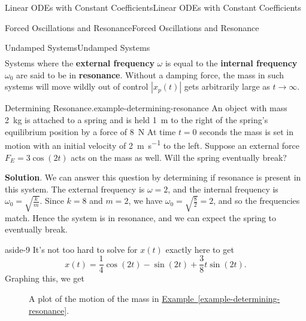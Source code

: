 \documentclass[10pt,]{book}
\newcommand{\terminology}[1]{\textbf{#1}}
\numberwithin{equation}{section}
\begin{document}
\begin{chapterptx}{Linear ODEs with Constant Coefficients}{}{Linear ODEs with Constant Coefficients}{}{}
\begin{sectionptx}{Forced Oscillations and Resonance}{}{Forced Oscillations and Resonance}{}{}
\begin{subsectionptx}{Undamped Systems}{}{Undamped Systems}{}{}
\begin{align*}
\end{align*}
Systems where the \terminology{external frequency} \(\omega\) is equal to the \terminology{internal frequency} \(\omega_{0}\) are said to be in \terminology{resonance}. Without a damping force, the mass in such systems will move wildly out of control \(|x_{p}(t)|\) gets arbitrarily large as \(t\to\infty\).%
\begin{example}{Determining Resonance.}{example-determining-resonance}%
\hypertarget{p-250}{}%
An object with mass \SI{2}{\kilo\gram} is attached to a spring and is held \SI{1}{\meter} to the right of the spring's equilibrium position by a force of \SI{8}{\newton} At time \(t = 0\) seconds the mass is set in motion with an initial velocity of \SI{2}{\meter\per\second} to the left. Suppose an external force \(F_{E} = 3\cos(2t)\) acts on the mass as well. Will the spring eventually break?%
\par\smallskip%
\noindent\textbf{Solution}.\hypertarget{solution-36}{}\quad%
\hypertarget{p-251}{}%
We can answer this question by determining if resonance is present in this system. The external frequency is \(\omega = 2\), and the internal frequency is \(\omega_{0} = \sqrt{\frac{k}{m}}\). Since \(k = 8\) and \(m = 2\), we have \(\omega_{0} = \sqrt{\frac{8}{2}} = 2\), and so the frequencies match. Hence the system is in resonance, and we can expect the spring to eventually break.%
\end{example}
\begin{aside}{}{aside-9}%
\hypertarget{p-252}{}%
It's not too hard to solve for \(x(t)\) exactly here to get%
\begin{equation*}
x(t) = \frac{1}{4}\cos(2t) - \sin(2t) + \frac{3}{8}t\sin(2t).
\end{equation*}
Graphing this, we get%
\begin{figure}
\centering
{
}
\caption{A plot of the motion of the mass in \hyperref[example-determining-resonance]{Example~\ref{example-determining-resonance}}.\label{figure-14}}
\end{figure}
\end{aside}

\end{subsectionptx}
\end{sectionptx}
\end{chapterptx}
\end{document}
